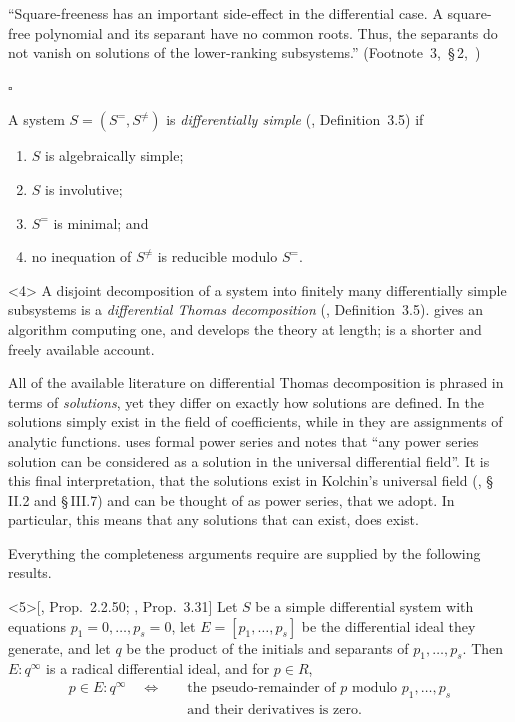\documentclass{article}
\theoremstyle{definition}
\theoremstyle{plain}
\newcommand{\condlabel}[1]{\hypertarget{cond:#1}{}}
\newcommand{\qedbox}{\hspace*{\fill}\ensuremath{\square}}
\begin{document}
``Square-freeness has an important side-effect in the differential case. A square-free polynomial and its separant
have no common roots. Thus, the separants do not vanish on solutions of the lower-ranking subsystems.'' (Footnote~3,~\S\,2,~\cite{ThomasDecomp})

\qedbox

A system $S = (S^=, S^{\ne})$ is {\it differentially simple}
(\cite{ThomasDecomp}, Definition~3.5) if

\begin{enumerate}
\item[\rm(S1)]\condlabel{S1} $S$ is algebraically simple;
\item[\rm(S2)]\condlabel{S2} $S$ is involutive;
\item[\rm(S3)]\condlabel{S3} $S^=$ is minimal; and
\item[\rm(S4)]\condlabel{S4} no inequation of $S^{\ne}$ is reducible modulo $S^=$.
\end{enumerate}

\begin{definition}<4>
\label{def:differential-Thomas-decomposition}
A disjoint decomposition of a system into finitely many differentially simple subsystems
is a {\it differential Thomas decomposition} (\cite{ThomasDecomp}, Definition~3.5).  \cite{ThomasDecomp} gives an algorithm computing one, and
\cite{RobertzLNM} develops the theory at length; \cite{RobertzCIRM} is a shorter and freely available account.

\noindent
All of the available literature on differential Thomas decomposition is phrased in terms of {\it solutions},
yet they differ on exactly how solutions are defined.
In \cite{RobertzLNM} the solutions simply exist in the field of coefficients, while 
in \cite{RobertzCIRM} they are assignments of analytic functions.
\cite{ThomasDecomp} uses formal power series and notes that ``any power series
solution can be considered as a solution in the universal differential field''.
It is this final interpretation, that the solutions exist in Kolchin's universal field (\cite{Kolchin}, \S\,II.2 and \S\,III.7)
and can be thought of as power series, that we adopt.  In particular, this means
that any solutions that can exist, does exist.
\end{definition}

\smallskip
Everything the completeness arguments require are supplied by the following results.

\begin{proposition}<5>[\cite{RobertzLNM}, Prop.~2.2.50; \cite{RobertzCIRM}, Prop.~3.31]
\label{prop:simple-membership}
Let $S$ be a simple
differential system with equations $p_1 = 0, \ldots, p_s = 0$, let
$E = [p_1, \ldots, p_s]$ be the differential ideal they generate, and let $q$ be
the product of the initials and separants of $p_1, \ldots, p_s$.  Then
$E : q^\infty$ is a radical differential ideal, and for $p \in R$,
%
\[
\begin{aligned}
p \in E : q^\infty
\quad\Longleftrightarrow\quad
&\text{the pseudo-remainder of $p$ modulo $p_1, \ldots, p_s$} \\
&\text{and their derivatives is zero.}
\end{aligned}
\]
\end{proposition}
\end{document}
